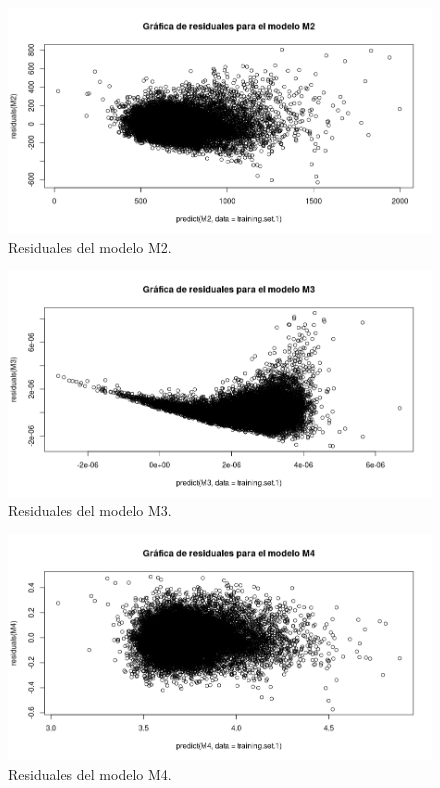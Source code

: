 \documentclass[10pt,letterpaper]{article}
\begin{document}
\begin{figure}[!htbp]
	\includegraphics[scale=0.5]{residuals_m2.png}
	\caption{Residuales del modelo M2.}
	\label{fig:res_m2}
\end{figure}

\begin{figure}[!htbp]
	\includegraphics[scale=0.5]{residuals_m3.png}
	\caption{Residuales del modelo M3.}
	\label{fig:res_m3}
\end{figure}

\begin{figure}[!htbp]
	\includegraphics[scale=0.5]{residuals_m4.png}
	\caption{Residuales del modelo M4.}
	\label{fig:res_m4}
\end{figure}
\end{document}

